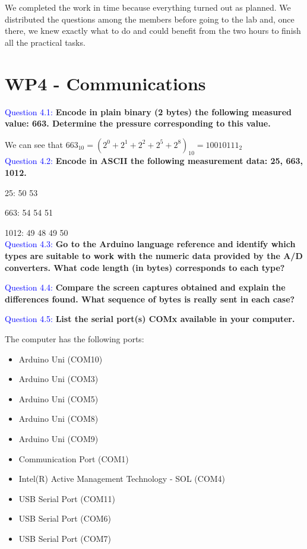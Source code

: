 \documentclass[12pt, a4papre]{article}
\begin{document}
	We completed the work in time because everything turned out as planned. We distributed the questions among the members before going to the lab and, once there, we knew exactly what to do and could benefit from the two hours to finish all the practical tasks. 
	
	\section{WP4 - Communications}
	
	\textcolor{blue}{Question 4.1:} \textbf{Encode in plain binary (2 bytes) the following measured value: 663. Determine the pressure corresponding to this value.}
	
	We can see that $663_{10} = (2^0 + 2^1 + 2^2 + 2^5 + 2^8)_{10} = 10010111_2$\\

	\textcolor{blue}{Question 4.2:}  \textbf{Encode in ASCII the following measurement data: 25, 663, 1012.}
	
		25: 50 53
		
		663: 54 54 51
		
		1012: 49 48 49 50\\
		
	\textcolor{blue}{Question 4.3:} \textbf{Go to the Arduino language reference and identify which types are suitable to work with the numeric data provided by the A/D converters. What code length (in bytes) corresponds to each type?}

	\textcolor{blue}{Question 4.4:} \textbf{Compare the screen captures obtained and explain the differences found. What sequence of bytes is really sent in each case?}

	\textcolor{blue}{Question 4.5:}  \textbf{List the serial port(s) COMx available in your computer. }
	
	The computer has the following ports:
	
	\begin{itemize}
		\item Arduino Uni (COM10)
		\item Arduino Uni (COM3)
		\item Arduino Uni (COM5)
		\item Arduino Uni (COM8)
		\item Arduino Uni (COM9)
		\item Communication Port (COM1)
		\item Intel(R) Active Management Technology - SOL (COM4)
		\item USB Serial Port (COM11)
		\item USB Serial Port (COM6)
		\item USB Serial Port (COM7)
	\end{itemize}
	
\end{document}
